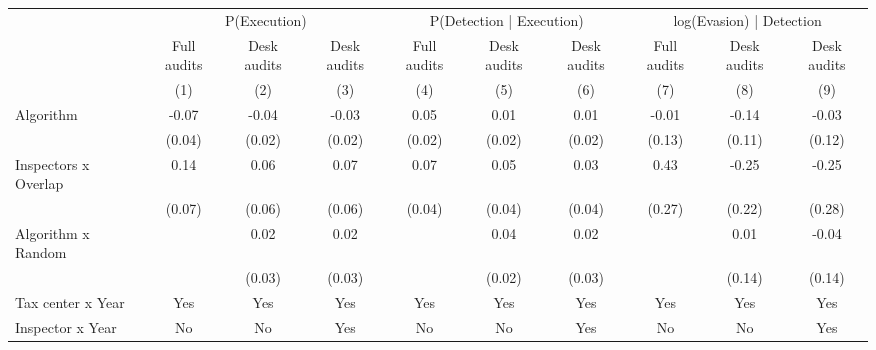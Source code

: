 \begin{tabular}{lccc|ccc|ccc} \toprule
\multicolumn{1}{l}{} & \multicolumn{3}{c}{P(Execution)} & \multicolumn{3}{c}{P(Detection | Execution)} & \multicolumn{3}{c}{log(Evasion) | Detection} \\\cmidrule(lr){2-4}\cmidrule(lr){5-7}\cmidrule(lr){8-10} \multicolumn{1}{l}{} & Full audits & Desk audits & Desk audits & Full audits & Desk audits & Desk audits & Full audits & Desk audits & Desk audits \\ \multicolumn{1}{l}{} & (1) & (2) & (3) & (4) & (5) & (6) & (7) & (8) & (9) \\ \midrule
Algorithm   &       -0.07\sym{**} &       -0.04         &       -0.03         &        0.05\sym{***}&        0.01         &        0.01         &       -0.01         &       -0.14         &       -0.03         \\
            &      (0.04)         &      (0.02)         &      (0.02)         &      (0.02)         &      (0.02)         &      (0.02)         &      (0.13)         &      (0.11)         &      (0.12)         \\
\addlinespace
Inspectors x Overlap&        0.14\sym{*}  &        0.06         &        0.07         &        0.07\sym{*}  &        0.05         &        0.03         &        0.43         &       -0.25         &       -0.25         \\
            &      (0.07)         &      (0.06)         &      (0.06)         &      (0.04)         &      (0.04)         &      (0.04)         &      (0.27)         &      (0.22)         &      (0.28)         \\
\addlinespace
Algorithm x Random&                     &        0.02         &        0.02         &                     &        0.04\sym{*}  &        0.02         &                     &        0.01         &       -0.04         \\
            &                     &      (0.03)         &      (0.03)         &                     &      (0.02)         &      (0.03)         &                     &      (0.14)         &      (0.14)         \\
\midrule
Tax center x Year&         Yes         &         Yes         &         Yes         &         Yes         &         Yes         &         Yes         &         Yes         &         Yes         &         Yes         \\
Inspector x Year&          No         &          No         &         Yes         &          No         &          No         &         Yes         &          No         &          No         &         Yes         \\

\end{tabular}
